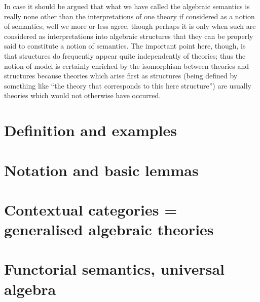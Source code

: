 In case it should be argued that what we have called the algebraic semantics is
really none other than the interpretations of one theory if considered as a
notion of semantics; well we more or less agree, though perhaps it is only when
such are considered as interpretations into algebraic structures that they can
be properly said to constitute a notion of semantics.
%
The important point here, though, is that structures do frequently appear quite
independently of theories; thus the notion of model is certainly enriched by the
isomorphism between theories and structures because theories which arise first as
structures (being defined by something like ``the theory that corresponds to
this here structure'') are usually theories which would not otherwise have
occurred.
%
%

\section{Definition and examples} \label{sec:source-2-2}





\lipsum[15]

\section{Notation and basic lemmas} \label{sec:source-2-3}

\lipsum[16]

\section{Contextual categories = generalised algebraic theories} \label{sec:source-2-4}

\lipsum[17]

\section{Functorial semantics, universal algebra} \label{sec:source-2-5}

\lipsum[18]

